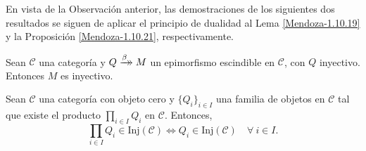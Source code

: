 \documentclass[tesis]{subfiles}
\begin{document}
%
%

En vista de la Observación anterior, las demostraciones de los siguientes dos resultados se siguen de aplicar el principio de dualidad al Lema \ref{Mendoza-1.10.19} y la Proposición \ref{Mendoza-1.10.21}, respectivamente.

\begin{Lema}\label{Mendoza-Ej.69}
    Sean $\mathscr{C}$ una categoría y $Q\xrightarrow[]{\beta}\mathrel{\mkern-14mu}\rightarrow M$ un epimorfismo escindible en $\mathscr{C}$, con $Q$ inyectivo. Entonces $M$ es inyectivo.
\end{Lema}

\begin{Prop}\label{Mendoza-Ej.71}
    Sean $\mathscr{C}$ una categoría con objeto cero y $\{Q_i\}_{i\in I}$ una familia de objetos en $\mathscr{C}$ tal que existe el producto $\prod_{i\in I}Q_i$ en $\mathscr{C}$. Entonces,
    \[
    \prod_{i\in I}Q_i\in \text{Inj}(\mathscr{C}) \iff Q_i\in \text{Inj}(\mathscr{C}) \quad \forall \ i\in I.
    \] 
\end{Prop}
\end{document}
